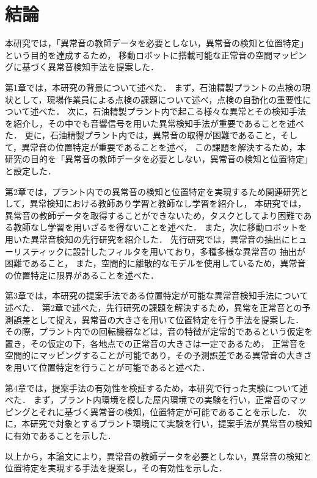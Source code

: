 \documentclass[../main]{subfiles}
\begin{document}
\section{結論}
\label{sec:conc_conclusion}
本研究では，「異常音の教師データを必要としない，異常音の検知と位置特定」という目的を達成するため，
移動ロボットに搭載可能な正常音の空間マッピングに基づく異常音検知手法を提案した．

第1章では，本研究の背景について述べた．
まず，石油精製プラントの点検の現状として，現場作業員による点検の課題について述べ，点検の自動化の重要性について述べた．
次に，石油精製プラント内で起こる様々な異常とその検知手法を紹介し，その中でも音響信号を用いた異常検知手法が重要であることを述べた．
更に，石油精製プラント内では，異常音の取得が困難であること，そして，異常音の位置特定が重要であることを述べ，
この課題を解決するため，本研究の目的を「異常音の教師データを必要としない，異常音の検知と位置特定」と設定した．

第2章では，プラント内での異常音の検知と位置特定を実現するため関連研究として，異常検知における教師あり学習と教師なし学習を紹介し，
本研究では，異常音の教師データを取得することができないため，タスクとしてより困難である教師なし学習を用いざるを得ないことを述べた．
また，次に移動ロボットを用いた異常音検知の先行研究を紹介した．
先行研究では，異常音の抽出にヒューリスティックに設計したフィルタを用いており，多種多様な異常音の
抽出が困難であること，
また，空間的に離散的なモデルを使用しているため，異常音の位置特定に限界があることを述べた．

第3章では，本研究の提案手法である位置特定が可能な異常音検知手法について述べた．
第2章で述べた，先行研究の課題を解決するため，異常を正常音との予測誤差として捉え，異常音の大きさを用いて位置特定を行う手法を提案した．
その際，プラント内での回転機器などは，音の特徴が定常的であるという仮定を置き，その仮定の下，各地点での正常音の大きさは一定であるため，
正常音を空間的にマッピングすることが可能であり，その予測誤差である異常音の大きさを用いて位置特定を行うことが可能であると述べた．

第4章では，提案手法の有効性を検証するため，本研究で行った実験について述べた．
まず，プラント内環境を模した屋内環境での実験を行い，正常音のマッピングとそれに基づく異常音の検知，位置特定が可能であることを示した．
次に，本研究で対象とするプラント環境にて実験を行い，提案手法が異常音の検知に有効であることを示した．

以上から，本論文により，異常音の教師データを必要としない，異常音の検知と位置特定を実現する手法を提案し，その有効性を示した．
\end{document}
